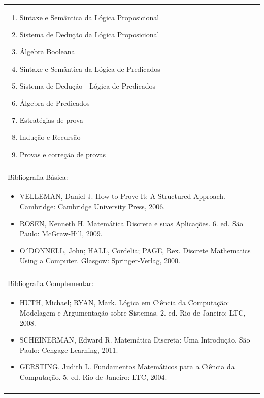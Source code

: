\documentclass[11pt]{article}
\begin{document}
\begin{center}
\begin{longtable}{|p{4cm}|p{4cm}|p{4cm}|p{4cm}|}
{\begin{enumerate}
\item Sintaxe e Semântica da Lógica Proposicional
\item Sistema de Dedução da Lógica Proposicional
\item Álgebra Booleana
\item Sintaxe e Semântica da Lógica de Predicados
\item Sistema de Dedução - Lógica de Predicados
\item Álgebra de Predicados
\item Estratégias de prova
\item Indução e Recursão
\item Provas e correção de provas
\end{enumerate}}\\
\multicolumn{4}{|p{16cm}|}{}\\
\hline
\multicolumn{4}{|p{16cm}|}{Bibliografia Básica:}\\
\multicolumn{4}{|p{16cm}|}{\begin{itemize}
\item VELLEMAN, Daniel J. How to Prove It: A Structured Approach. Cambridge: Cambridge University Press, 2006.
\item ROSEN, Kenneth H. Matemática Discreta e suas Aplicações. 6. ed. São Paulo: McGraw-Hill, 2009.
\item O´DONNELL, John; HALL, Cordelia; PAGE, Rex. Discrete Mathematics Using a Computer. Glasgow: Springer-Verlag, 2000.
\end{itemize}}\\
\multicolumn{4}{|p{16cm}|}{} \\
\hline
\multicolumn{4}{|p{16cm}|}{Bibliografia Complementar:}\\
\multicolumn{4}{|p{16cm}|}{\begin{itemize}
\item HUTH, Michael; RYAN, Mark. Lógica em Ciência da Computação: Modelagem e Argumentação sobre Sistemas. 2. ed. Rio de Janeiro: LTC, 2008.
\item SCHEINERMAN, Edward R. Matemática Discreta: Uma Introdução. São Paulo: Cengage Learning, 2011.
\item GERSTING, Judith L. Fundamentos Matemáticos para a Ciência da Computação. 5. ed. Rio de Janeiro: LTC, 2004.
\end{itemize}}\\
\multicolumn{4}{|p{16cm}|}{} \\
\hline
\end{longtable}
\end{center}
\end{document}
